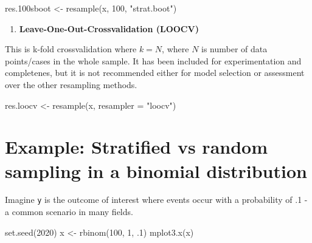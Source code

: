 \documentclass[
]{book}
\newenvironment{Shaded}{\begin{snugshade}}{\end{snugshade}}
\newcommand{\AttributeTok}[1]{\textcolor[rgb]{0.77,0.63,0.00}{#1}}
\newcommand{\DecValTok}[1]{\textcolor[rgb]{0.00,0.00,0.81}{#1}}
\newcommand{\FloatTok}[1]{\textcolor[rgb]{0.00,0.00,0.81}{#1}}
\newcommand{\FunctionTok}[1]{\textcolor[rgb]{0.00,0.00,0.00}{#1}}
\newcommand{\NormalTok}[1]{#1}
\newcommand{\OtherTok}[1]{\textcolor[rgb]{0.56,0.35,0.01}{#1}}
\newcommand{\StringTok}[1]{\textcolor[rgb]{0.31,0.60,0.02}{#1}}
\providecommand{\tightlist}{%
  \setlength{\itemsep}{0pt}\setlength{\parskip}{0pt}}
\begin{document}
\begin{Shaded}
\begin{Highlighting}[]
\NormalTok{res}\FloatTok{.100}\NormalTok{sboot }\OtherTok{\textless{}{-}} \FunctionTok{resample}\NormalTok{(x, }\DecValTok{100}\NormalTok{, }\StringTok{"strat.boot"}\NormalTok{)}
\end{Highlighting}
\end{Shaded}

\begin{enumerate}
\def\labelenumi{\arabic{enumi}.}
\setcounter{enumi}{4}
\tightlist
\item
  \textbf{Leave-One-Out-Crossvalidation (LOOCV)}
\end{enumerate}

This is k-fold crossvalidation where \(k = N\), where \(N\) is number of data points/cases in the whole sample. It has been included for experimentation and completenes, but it is not recommended either for model selection or assessment over the other resampling methods.

\begin{Shaded}
\begin{Highlighting}[]
\NormalTok{res.loocv }\OtherTok{\textless{}{-}} \FunctionTok{resample}\NormalTok{(x, }\AttributeTok{resampler =} \StringTok{"loocv"}\NormalTok{)}
\end{Highlighting}
\end{Shaded}

\hypertarget{example-stratified-vs-random-sampling-in-a-binomial-distribution}{%
\section{Example: Stratified vs random sampling in a binomial distribution}\label{example-stratified-vs-random-sampling-in-a-binomial-distribution}}

Imagine \texttt{y} is the outcome of interest where events occur with a probability of .1 - a common scenario in many fields.

\begin{Shaded}
\begin{Highlighting}[]
\FunctionTok{set.seed}\NormalTok{(}\DecValTok{2020}\NormalTok{)}
\NormalTok{x }\OtherTok{\textless{}{-}} \FunctionTok{rbinom}\NormalTok{(}\DecValTok{100}\NormalTok{, }\DecValTok{1}\NormalTok{, .}\DecValTok{1}\NormalTok{)}
\FunctionTok{mplot3.x}\NormalTok{(x)}
\end{Highlighting}
\end{Shaded}
\end{document}
